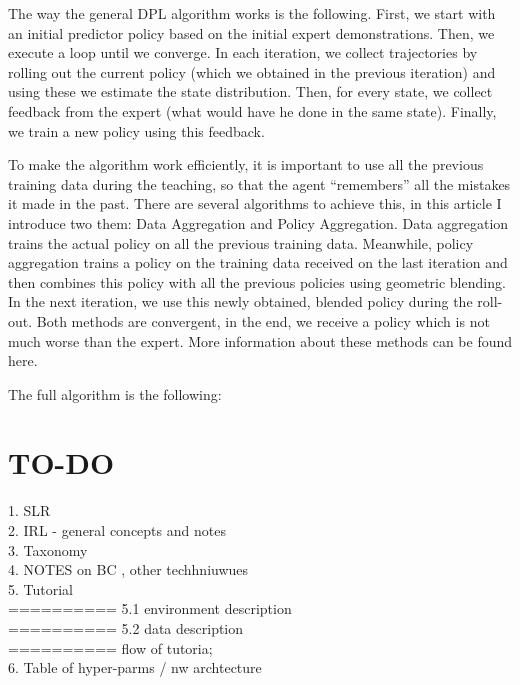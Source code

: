 \documentclass{article}
\begin{document}
The way the general DPL algorithm works is the following. First, we start with an initial predictor policy based on the initial expert demonstrations. Then, we execute a loop until we converge. In each iteration, we collect trajectories by rolling out the current policy (which we obtained in the previous iteration) and using these we estimate the state distribution. Then, for every state, we collect feedback from the expert (what would have he done in the same state). Finally, we train a new policy using this feedback.

To make the algorithm work efficiently, it is important to use all the previous training data during the teaching, so that the agent “remembers” all the mistakes it made in the past. There are several algorithms to achieve this, in this article I introduce two them: Data Aggregation and Policy Aggregation. Data aggregation trains the actual policy on all the previous training data. Meanwhile, policy aggregation trains a policy on the training data received on the last iteration and then combines this policy with all the previous policies using geometric blending. In the next iteration, we use this newly obtained, blended policy during the roll-out. Both methods are convergent, in the end, we receive a policy which is not much worse than the expert. More information about these methods can be found here.

The full algorithm is the following:





\section{TO-DO}

1. SLR \\
2. IRL - general concepts and notes \\
3. Taxonomy \\
4. NOTES on BC , other techhniuwues\\
5. Tutorial \\
========== 5.1 environment description\\
========== 5.2 data  description\\
========== flow of tutoria; \\

6. Table of hyper-parms / nw archtecture\\



\clearpage
\end{document}
